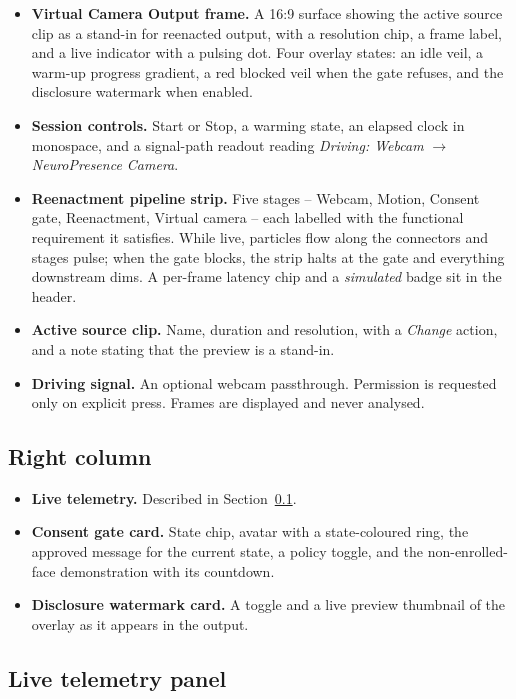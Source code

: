 \documentclass[11pt,a4paper]{report}
\begin{document}
\begin{itemize}
  \item \textbf{Virtual Camera Output frame.} A 16:9 surface showing the active
    source clip as a stand-in for reenacted output, with a resolution chip, a
    frame label, and a live indicator with a pulsing dot. Four overlay states:
    an idle veil, a warm-up progress gradient, a red blocked veil when the gate
    refuses, and the disclosure watermark when enabled.
  \item \textbf{Session controls.} Start or Stop, a warming state, an elapsed
    clock in monospace, and a signal-path readout reading
    \emph{Driving: Webcam} $\rightarrow$ \emph{NeuroPresence Camera}.
  \item \textbf{Reenactment pipeline strip.} Five stages -- Webcam, Motion,
    Consent gate, Reenactment, Virtual camera -- each labelled with the
    functional requirement it satisfies. While live, particles flow along the
    connectors and stages pulse; when the gate blocks, the strip halts at the
    gate and everything downstream dims. A per-frame latency chip and a
    \emph{simulated} badge sit in the header.
  \item \textbf{Active source clip.} Name, duration and resolution, with a
    \emph{Change} action, and a note stating that the preview is a stand-in.
  \item \textbf{Driving signal.} An optional webcam passthrough. Permission is
    requested only on explicit press. Frames are displayed and never analysed.
\end{itemize}

\subsection*{Right column}

\begin{itemize}
  \item \textbf{Live telemetry.} Described in Section~\ref{sec:metrics}.
  \item \textbf{Consent gate card.} State chip, avatar with a state-coloured
    ring, the approved message for the current state, a policy toggle, and the
    non-enrolled-face demonstration with its countdown.
  \item \textbf{Disclosure watermark card.} A toggle and a live preview
    thumbnail of the overlay as it appears in the output.
\end{itemize}

\subsection{Live telemetry panel}
\label{sec:metrics}
\end{document}
